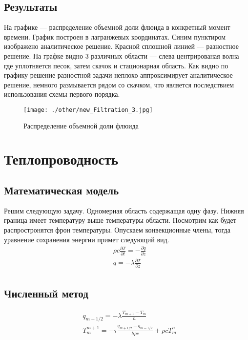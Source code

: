 \documentclass[12pt,a4paper]{article}
\newcommand{\pd}[2]{\frac{\partial #1}{\partial #2}}
\begin{document}
\subsection{Результаты}
На графике --- распределение объемной доли флюида в конкретный момент времени. График построен в лагранжевых координатах. Синим пунктиром изображено аналитическое решение. Красной сплошной линией --- разностное решение. На графке видно 3 различных области --- слева центрированая волна где уплотняется песок, затем скачок и стационарная область. Как видно по графику решение разностной задачи неплохо аппроксимирует аналитическое решение, немного размывается рядом со скачком, что является последствием использования схемы первого порядка.
\begin{figure}[h!]
\begin{center}
\texttt{[image: ./other/new\_Filtration\_3.jpg]}
\caption{Распределение объемной доли флюида}
\end{center}
\end{figure}

\newpage
\section{Теплопроводность}
\subsection{Математическая модель}
Решим следующую задачу. Одномерная область содержащая одну фазу. Нижняя граница имеет температуру выше температуры области. Посмотрим как будет распростронятся фрон температуры. Опускаем конвекционные члены, тогда уравнение сохранения энергии примет следующий вид.
\begin{equation}
\begin{aligned}
&\rho c \pd{T}{t} = - \pd{q}{z}\\
&q = - \lambda\pd{T}{z}\\
\label{termal}
\end{aligned}
\end{equation}

\subsection{Численный метод}
\begin{equation}
\begin{aligned}
&q_{m+1/2} = - \lambda\frac{T_{m+1} - T_m}{h}\\
&T_m^{m+1} = - \tau\frac{q_{m+1/2} - q_{m-1/2}}{h\rho c} + \rho c T_m^n\\
\label{termal_razn}
\end{aligned}
\end{equation}
\end{document}
